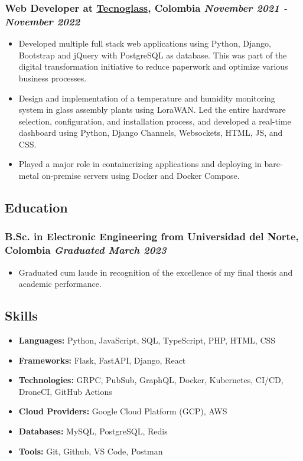 \documentclass[a4paper,10pt]{article}
\begin{document}
\subsubsection*{%
  \textbf{Web Developer} at \href{https://www.tecnoglass.com/en/}{Tecnoglass}, Colombia
  \hfill
  \textit{November 2021 - November 2022}
}
\begin{itemize}
  \item Developed multiple full stack web applications using Python, Django, Bootstrap and jQuery with PostgreSQL as database.
    This was part of the digital transformation initiative to reduce paperwork and optimize various business processes.
  \item Design and implementation of a temperature and humidity monitoring system in glass assembly plants using LoraWAN.
    Led the entire hardware selection, configuration, and installation process, and developed a real-time
    dashboard using Python, Django Channels, Websockets, HTML, JS, and CSS.
  \item Played a major role in containerizing applications and deploying in bare-metal on-premise servers using Docker and Docker Compose.
\end{itemize}

\subsection*{Education}
\subsubsection*{\textbf{B.Sc. in Electronic Engineering} from Universidad del Norte, Colombia \hfill \textit{Graduated March 2023}}
\begin{itemize}
  \item Graduated cum laude in recognition of the excellence of my final thesis and academic performance.
\end{itemize}

\subsection*{Skills}
\begin{itemize}
  \item \textbf{Languages:} Python, JavaScript, SQL, TypeScript, PHP, HTML, CSS
  \item \textbf{Frameworks:} Flask, FastAPI, Django, React
  \item \textbf{Technologies:} GRPC, PubSub, GraphQL, Docker, Kubernetes, CI/CD, DroneCI, GitHub Actions
  \item \textbf{Cloud Providers:} Google Cloud Platform (GCP), AWS
  \item \textbf{Databases:} MySQL, PostgreSQL, Redis
  \item \textbf{Tools:} Git, Github, VS Code, Postman
\end{itemize}

\end{document}
